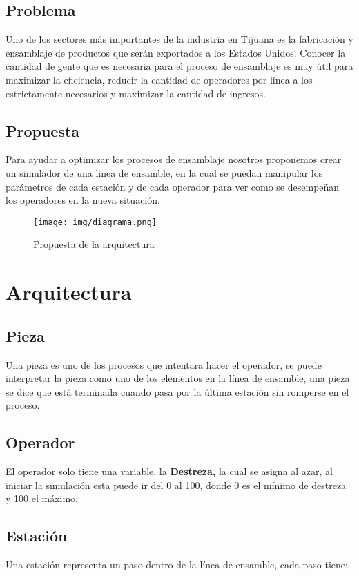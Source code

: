 \documentclass[11pt]{article}
\begin{document}
\subsection{Problema}
\label{sec:org9d389d2}
Uno de los sectores más importantes de la industria en Tijuana es la fabricación y ensamblaje de productos que serán exportados a los Estados Unidos. Conocer la cantidad de gente que es necesaria para el proceso de ensamblaje es muy útil para maximizar la eficiencia, reducir la cantidad de operadores por línea a los estrictamente necesarios y maximizar la cantidad de ingresos.

\subsection{Propuesta}
\label{sec:org9d1d96c}
Para ayudar a optimizar los procesos de ensamblaje nosotros proponemos crear un simulador de una linea de ensamble, en la cual se puedan manipular los parámetros de cada estación y de cada operador para ver como se desempeñan los
operadores en la nueva situación.

\begin{figure}[htbp]
\centering
\texttt{[image: img/diagrama.png]}
\caption{Propuesta de la arquitectura}
\end{figure}

\section{Arquitectura}
\label{sec:orgff29a8a}
\subsection{Pieza}
\label{sec:org10bb4b3}
Una pieza es uno de los procesos que intentara hacer el operador, se puede interpretar la pieza como uno de los elementos en la línea de ensamble, una pieza se dice que está terminada cuando pasa por la última estación sin romperse en el proceso. 

\subsection{Operador}
\label{sec:org259feee}
El operador solo tiene una variable, la \textbf{Destreza,} la cual se asigna al azar, al iniciar la simulación esta puede ir del 0 al 100, donde 0 es el mínimo de destreza y 100 el máximo. 

\subsection{Estación}
\label{sec:orgfed658e}
Una estación representa un paso dentro de la línea de ensamble, cada paso tiene:
\end{document}
